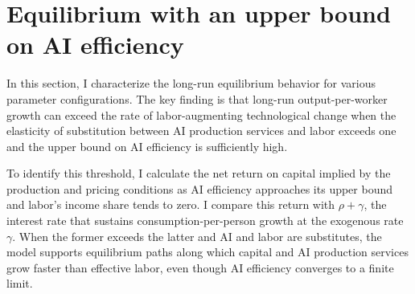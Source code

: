 \section{Equilibrium with an upper bound on AI efficiency}
\label{sec:rewrite-regimes}

In this section, I characterize the long-run equilibrium behavior for various parameter configurations. The key finding is that long-run output-per-worker growth can exceed the rate of labor-augmenting technological change when the elasticity of substitution between AI production services and labor exceeds one and the upper bound on AI efficiency is sufficiently high.

To identify this threshold, I calculate the net return on capital implied by the production and pricing conditions as AI efficiency approaches its upper bound and labor's income share tends to zero. I compare this return with $\rho+\gamma$, the interest rate that sustains consumption-per-person growth at the exogenous rate $\gamma$. When the former exceeds the latter and AI and labor are substitutes, the model supports equilibrium paths along which capital and AI production services grow faster than effective labor, even though AI efficiency converges to a finite limit.


